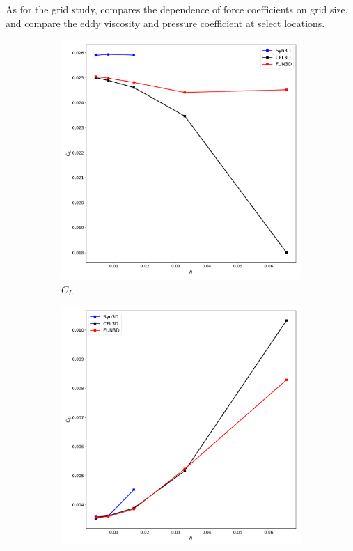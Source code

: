 As for the grid study,  compares the dependence of force coefficients on grid size,  and  compare the eddy viscosity and pressure coefficient at select locations.
\begin{figure}[ht!]
\centering
\begin{subfigure}{.45\textwidth}
  \centering
  \includegraphics[width=1.0\textwidth]{figs/3dbump/C_L_GridStudy.pdf}
  \caption{$C_L$}
\end{subfigure}%
\begin{subfigure}{.45\textwidth}
  \centering
  \includegraphics[width=1.0\textwidth]{figs/3dbump/C_D_GridStudy.pdf}

\end{subfigure}
\end{figure}
